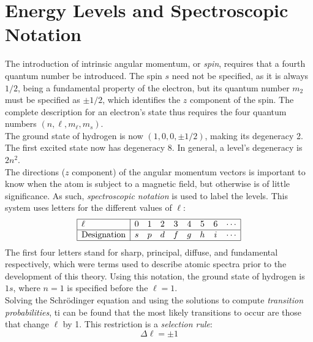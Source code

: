 \documentclass{subfiles}
\begin{document}
	\section{Energy Levels and Spectroscopic Notation}
		The introduction of intrinsic angular momentum, or \textit{spin}, requires that a fourth quantum number be introduced. The spin \(s\) need not be specified, as it is always \(1/2\), being a fundamental property of the electron, but its quantum number \(m_2\) must be specified as \(\pm 1/2\), which identifies the \(z\) component of the spin. The complete description for an electron's state thus requires the four quantum numbers \((n, \ell, m_\ell, m_s)\). \\
		The ground state of hydrogen is now \((1, 0, 0, \pm 1/2)\), making its degeneracy 2. The first excited state now has degeneracy 8. In general, a level's degeneracy is \(2n^2\). \\
		The directions (\(z\) component) of the angular momentum vectors is important to know when the atom is subject to a magnetic field, but otherwise is of little significance. As such, \textit{spectroscopic notation} is used to label the levels. This system uses letters for the different values of \(\ell\):
		\[\begin{array}{|l|cccccccc|}\hline
			\ell & 0 & 1 & 2 & 3 & 4 & 5 & 6 & \cdots \\\hline
			\text{Designation} & s & p & d & f & g & h & i & \cdots \\\hline
		\end{array}\]
		The first four letters stand for sharp, principal, diffuse, and fundamental respectively, which were terms used to describe atomic spectra prior to the development of this theory. Using this notation, the ground state of hydrogen is \(1s\), where \(n = 1\) is specified before the \(\ell = 1\). \\
		Solving the Schr\"odinger equation and using the solutions to compute \textit{transition probabilities}, ti can be found that the most likely transitions to occur are those that change \(\ell\) by 1. This restriction is a \textit{selection rule}:
			\[
				\Delta \ell = \pm 1
					\tag{selection rule}
			\]
\end{document}
